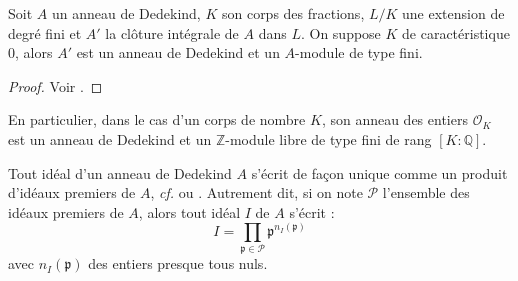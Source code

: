 \documentclass[a4paper]{article} %
\numberwithin{section}{part}
\numberwithin{equation}{section}
\newcommand\QQ{\mathbb{Q}}
\newcommand\ZZ{\mathbb{Z}}
\newcommand\EO{\mathcal{O}}
\begin{document}
\begin{thm}
Soit $A$ un anneau de Dedekind, $K$ son corps des fractions, $L/K$ une extension
de degré fini et $A'$ la clôture intégrale de $A$ dans $L$. On suppose $K$ de
caractéristique $0$, alors $A'$ est un anneau de Dedekind et un $A$-module de
type fini.
\end{thm}
\begin{proof}
Voir \cite[p.~59, th. 1]{Sam}.
\end{proof}
\begin{rem}
En particulier, dans le cas d'un corps de nombre $K$, son anneau des entiers
$\EO_K$ est un anneau de Dedekind et un $\ZZ$-module libre de type fini de rang
$[K:\QQ]$.
\end{rem}
Tout idéal d'un anneau de Dedekind $A$ s'écrit de façon unique comme un produit 
d'idéaux premiers de $A$, \emph{cf.} \cite[p.~60, th. 3]{Sam} ou 
\cite[§I.6, th. 2]{Lan2}. Autrement dit, si on note $\mathcal{P}$ l'ensemble des
idéaux premiers de $A$, alors tout idéal $I$ de $A$ s'écrit :
\begin{equation}
I = \prod_{\mathfrak{p}\in \mathcal{P}}{\mathfrak{p}^{n_I(\mathfrak{p})}}
\end{equation}
avec $n_I(\mathfrak{p})$ des entiers presque tous nuls.
\end{document}
